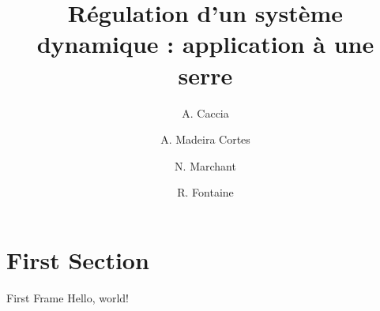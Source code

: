 \documentclass{beamer}
\title{Régulation d'un système dynamique : application à une serre}
\date{ }
\author{A. Caccia \and A. Madeira Cortes \and N. Marchant \and R. Fontaine}
\institute{Université Libre de Bruxelles}
\begin{document}
  \maketitle
  \section{First Section}
  \begin{frame}{First Frame}
    Hello, world!
  \end{frame}
\end{document}
